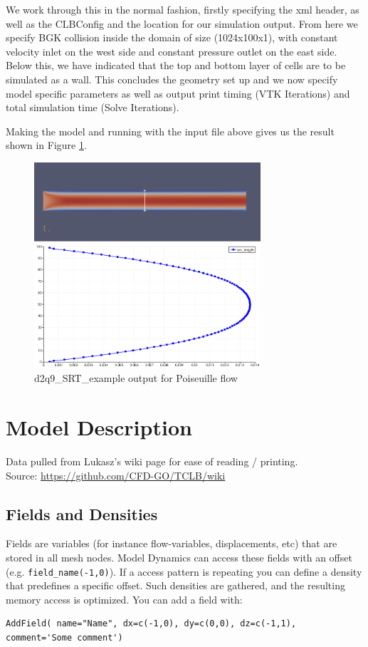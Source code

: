 \documentclass[12pt,a4paper]{report}
\begin{document}
We work through this in the normal fashion, firstly specifying the xml header, as well as the CLBConfig and the location for our simulation output. From here we specify BGK collision inside the domain of size (1024x100x1), with constant velocity inlet on the west side and constant pressure outlet on the east side. Below this, we have indicated that the top and bottom layer of cells are to be simulated as a wall. This concludes the geometry set up and we now specify model specific parameters as well as output print timing (VTK Iterations) and total simulation time (Solve Iterations).

Making the model and running with the input file above gives us the result shown in Figure \ref{fig:d2q9_SRT_example}.

\begin{figure}[!h]
\centering
\includegraphics[width=0.75\textwidth]{figures/d2q9_SRT_example.png}
\caption{d2q9\_SRT\_example output for Poiseuille flow}
\label{fig:d2q9_SRT_example}
\end{figure}


\newpage
\section{Model Description} \label{sec:Model Description}
Data pulled from Lukasz's wiki page for ease of reading / printing. \\
Source: \url{https://github.com/CFD-GO/TCLB/wiki}
\subsection{Fields and Densities}
Fields are variables (for instance flow-variables, displacements, etc) that are stored in all mesh nodes. Model Dynamics can access these fields with an offset (e.g. \lstinline$field_name(-1,0)$). If a access pattern is repeating you can define a density that predefines a specific offset. Such densities are gathered, and the resulting memory access is optimized. You can add a field with:
\begin{lstlisting}
AddField( name="Name", dx=c(-1,0), dy=c(0,0), dz=c(-1,1), comment='Some comment')
\end{lstlisting}
\end{document}
